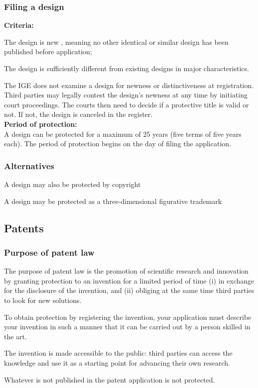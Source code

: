 \subsubsection{Filing a design}
\textbf{Criteria:} 
\begin{compactitem}
	\item The design is new , meaning no other identical or similar design has been	published before application;
	\item The design is sufficiently different from existing designs in major characteristics.
\end{compactitem}
The IGE does not examine a design for newness or distinctiveness at registration. Third parties may legally contest the design’s newness at any time by initiating court proceedings. The courts then need to decide if a protective title is valid
or not. If not, the design is canceled in the register.\\
\textbf{Period of protection:}\\
A design can be protected for a maximum of 25 years (five terms of five years each). The period of protection begins on the day of filing the application.

\subsubsection{Alternatives}
\begin{compactitem}
	\item A design may also be protected by copyright
	\item A design may be protected as a three-dimensional figurative trademark
\end{compactitem}

\subsection{Patents}
\subsubsection{Purpose of patent law}
The purpose of patent law is the promotion of scientific research and innovation by granting protection to an invention for a limited period of time (i) in exchange for the disclosure of the invention, and (ii) obliging at the same time third parties to look for new solutions.
\begin{compactitem}
	\item To obtain protection by registering the invention, your application must describe your invention in such a manner that it can be carried out by a	person skilled in the art.
	\item The invention is made accessible to the public: third parties can access the knowledge and use it as a starting point for advancing their own research.
	\item Whatever is not published in the patent application is not protected.
\end{compactitem}

